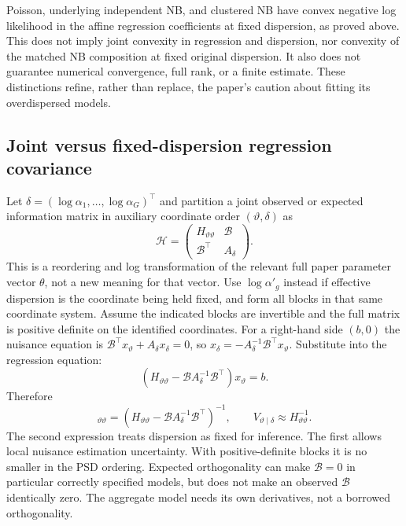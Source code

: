 \documentclass[11pt,a4paper]{article}
\numberwithin{equation}{section}
\begin{document}
Poisson, underlying independent NB, and clustered NB have convex
negative log likelihood in the affine regression coefficients at fixed
dispersion, as proved above. This does not imply joint convexity in
regression and dispersion, nor convexity of the matched NB composition
at fixed original dispersion. It also does not guarantee numerical
convergence, full rank, or a finite estimate.
These distinctions refine, rather than replace, the paper's caution
about fitting its overdispersed models.

\subsection{Joint versus fixed-dispersion regression covariance}
Let $\delta=(\log\alpha_1,\ldots,\log\alpha_G)^\top$ and partition a
joint observed or expected information matrix in auxiliary coordinate
order $(\vartheta,\delta)$ as
\begin{equation}
 \mathcal H=\begin{pmatrix}
 H_{\vartheta\vartheta}&\mathcal B\\
 \mathcal B^\top&A_\delta
 \end{pmatrix}.
\end{equation}
This is a reordering and log transformation of the relevant full
paper parameter vector $\theta$, not a new meaning for that vector.
Use $\log\alpha'_g$ instead if effective dispersion is the coordinate
being held fixed, and form all blocks in that same coordinate system.
Assume the indicated blocks are invertible and the full matrix is
positive definite on the identified coordinates.
For a right-hand side $(b,0)$ the nuisance equation is
$\mathcal B^\top x_\vartheta+A_\delta x_\delta=0$, so
$x_\delta=-A_\delta^{-1}\mathcal B^\top x_\vartheta$.
Substitute into the regression equation:
\begin{equation}
 (H_{\vartheta\vartheta}-\mathcal B A_\delta^{-1}\mathcal B^\top)x_\vartheta=b.
\end{equation}
Therefore
\begin{equation}
 [\mathcal H^{-1}]_{\vartheta\vartheta}
   =(H_{\vartheta\vartheta}-\mathcal B A_\delta^{-1}\mathcal B^\top)^{-1},
 \qquad V_{\vartheta\mid\delta}\approx H_{\vartheta\vartheta}^{-1}.
 \label{eq:nuisance-schur}
\end{equation}
The second expression treats dispersion as fixed for inference.
The first allows local nuisance estimation uncertainty.
With positive-definite blocks it is no smaller in the PSD ordering.
Expected orthogonality can make $\mathcal B=0$ in particular correctly specified
models, but does not make an observed $\mathcal B$ identically zero.
The aggregate model needs its own derivatives, not a borrowed orthogonality.
\end{document}
